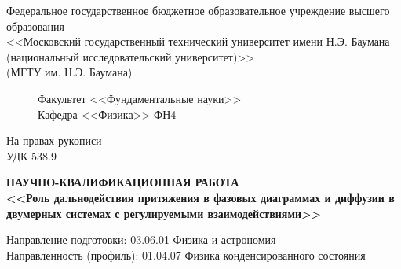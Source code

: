 \documentclass[%
candidate, %
subf, %
]{disser}
\begin{document}
%


\begin{titlepage}

\begin{center}
{
\footnotesize{}
Федеральное государственное бюджетное образовательное учреждение высшего образования\\
<<Московский государственный технический университет имени Н.Э. Баумана\\ (национальный исследовательский университет)>>\\(МГТУ им. Н.Э. Баумана)\\
}
\end{center}
\begin{figure}[h!]
\begin{minipage}[b]{0.9\textwidth}\centering
Факультет <<Фундаментальные науки>>\\
Кафедра <<Физика>> ФН4
\\\vspace{1.5cm}
\end{minipage}
\end{figure}
\begin{flushright}
На правах рукописи\\
УДК 538.9
\end{flushright}

\vspace{10mm}

\begin{center}
\textbf{НАУЧНО-КВАЛИФИКАЦИОННАЯ РАБОТА}\\\vspace{5mm}
\textbf{<<Роль дальнодействия притяжения в фазовых диаграммах и диффузии в двумерных системах с регулируемыми взаимодействиями>>}
\end{center}


\vspace{5mm}

\begin{flushleft}
Направление подготовки: 03.06.01 Физика и астрономия\\
Направленность (профиль): 01.04.07 Физика конденсированного состояния
\end{flushleft}


\end{titlepage}
\end{document}
